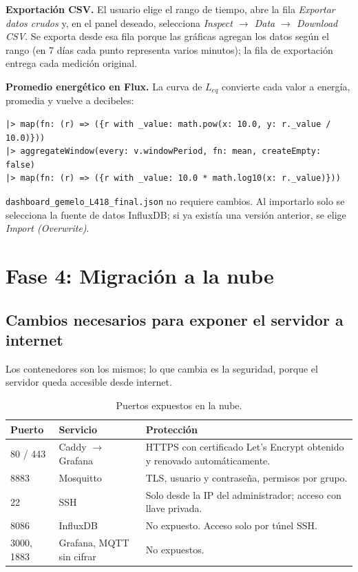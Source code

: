 \documentclass[11pt,a4paper]{article}
\newcommand{\arch}[1]{\texttt{#1}}
\begin{document}
\textbf{Exportaci\'on CSV.} El usuario elige el rango de tiempo, abre la fila
\emph{Exportar datos crudos} y, en el panel deseado, selecciona \emph{Inspect $\rightarrow$
Data $\rightarrow$ Download CSV}. Se exporta desde esa fila porque las gr\'aficas agregan los
datos seg\'un el rango (en 7 d\'ias cada punto representa varios minutos); la fila de
exportaci\'on entrega cada medici\'on original.

\textbf{Promedio energ\'etico en Flux.} La curva de $L_{eq}$ convierte cada valor a
energ\'ia, promedia y vuelve a decibeles:
\begin{lstlisting}[style=plano]
|> map(fn: (r) => ({r with _value: math.pow(x: 10.0, y: r._value / 10.0)}))
|> aggregateWindow(every: v.windowPeriod, fn: mean, createEmpty: false)
|> map(fn: (r) => ({r with _value: 10.0 * math.log10(x: r._value)}))
\end{lstlisting}

\begin{completar}
\arch{dashboard\_gemelo\_L418\_final.json} no requiere cambios. Al importarlo solo se
selecciona la fuente de datos InfluxDB; si ya exist\'ia una versi\'on anterior, se elige
\emph{Import (Overwrite)}.
\end{completar}

\section{Fase 4: Migraci\'on a la nube}

\subsection{Cambios necesarios para exponer el servidor a internet}

Los contenedores son los mismos; lo que cambia es la seguridad, porque el servidor queda
accesible desde internet.

\begin{table}[H]
\centering
\caption{Puertos expuestos en la nube.}
\begin{tabularx}{\textwidth}{@{}llX@{}}
\toprule
\textbf{Puerto} & \textbf{Servicio} & \textbf{Protecci\'on} \\
\midrule
80 / 443 & Caddy $\rightarrow$ Grafana & HTTPS con certificado Let's Encrypt obtenido y
renovado autom\'aticamente. \\
8883 & Mosquitto & TLS, usuario y contrase\~na, permisos por grupo. \\
22 & SSH & Solo desde la IP del administrador; acceso con llave privada. \\
\midrule
8086 & InfluxDB & No expuesto. Acceso solo por t\'unel SSH. \\
3000, 1883 & Grafana, MQTT sin cifrar & No expuestos. \\
\bottomrule
\end{tabularx}
\end{table}
\end{document}
